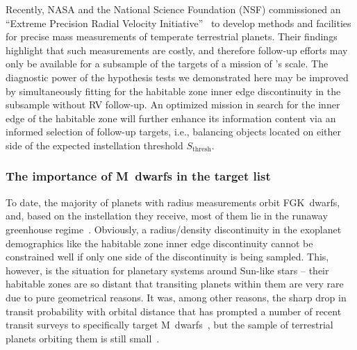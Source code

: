 \documentclass[twocolumn,twocolappendix]{aastex631}
\begin{document}
Recently, NASA and the National Science Foundation (NSF) commissioned an ``Extreme Precision Radial Velocity Initiative''~\citep{Crass2021} to develop methods and facilities for precise mass measurements of temperate terrestrial planets.
Their findings highlight that such measurements are costly, and therefore follow-up efforts may only be available for a subsample of the targets of a mission of \plato's scale.
The diagnostic power of the hypothesis tests we demonstrated here may be improved by simultaneously fitting for the habitable zone inner edge discontinuity in the subsample without RV follow-up.
An optimized mission in search for the inner edge of the habitable zone will further enhance its information content via an informed selection of follow-up targets, i.e., balancing objects located on either side of the expected instellation threshold $S_\mathrm{thresh}$.

\subsubsection{The importance of M~dwarfs in the target list}
To date, the majority of planets with radius measurements orbit FGK~dwarfs, and, based on the instellation they receive, most of them lie in the runaway greenhouse regime~\citep{Thompson2018}.
Obviously, a radius/density discontinuity in the exoplanet demographics like the habitable zone inner edge discontinuity cannot be constrained well if only one side of the discontinuity is being sampled.
This, however, is the situation for planetary systems around Sun-like stars -- their habitable zones are so distant that transiting planets within them are very rare due to pure geometrical reasons.
It was, among other reasons, the sharp drop in transit probability with orbital distance that has prompted a number of recent transit surveys to specifically target M~dwarfs~\citep[e.g.,][]{Irwin2009,Obermeier2016,Delrez2018,Sebastian2021,Dietrich2023}, but the sample of terrestrial planets orbiting them is still small~\citep[e.g.,][]{Berger2020,Hardegree-Ullman2020a}.
\end{document}
